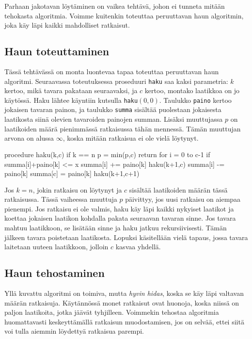 Parhaan jakotavan löytäminen on vaikea tehtävä,
johon ei tunneta mitään tehokasta algoritmia.
Voimme kuitenkin toteuttaa peruuttavan haun algoritmin,
joka käy läpi kaikki mahdolliset ratkaisut.

\subsection{Haun toteuttaminen}

Tässä tehtävässä on monta luontevaa tapaa toteuttaa
peruuttavan haun algoritmi.
Seuraavassa toteutuksessa proseduuri \texttt{haku} saa kaksi parametria:
$k$ kertoo, mikä tavara pakataan seuraavaksi,
ja $c$ kertoo, montako laatikkoa on jo käytössä.
Haku lähtee käyntiin kutsulla \texttt{haku}$(0,0)$.
Taulukko \texttt{paino} kertoo jokaisen tavaran painon,
ja taulukko \texttt{summa} sisältää puolestaan
jokaisesta laatikosta siinä olevien tavaroiden painojen summan.
Lisäksi muuttujassa $p$ on laatikoiden määrä pienimmässä ratkaisussa
tähän mennessä.
Tämän muuttujan arvona on alussa $\infty$,
koska mitään ratkaisua ei ole vielä löytynyt.

\begin{code}
procedure haku(k,c)
    if k == n
        p = min(p,c)
        return
    for i = 0 to c-1
        if summa[i]+paino[k] <= x
            summa[i] += paino[k]
            haku(k+1,c)
            summa[i] -= paino[k]
    summa[c] = paino[k]
    haku(k+1,c+1)
\end{code}

Jos $k=n$, jokin ratkaisu on löytynyt ja $c$ sisältää
laatikoiden määrän tässä ratkaisussa.
Tässä vaiheessa muuttuja $p$ päivittyy,
jos uusi ratkaisu on aiempaa pienempi.
Jos ratkaisu ei ole valmis, haku käy läpi kaikki
nykyiset laatikot ja koettaa jokaisen laatikon
kohdalla pakata seuraavan tavaran sinne.
Jos tavara mahtuu laatikkoon,
se lisätään sinne ja haku jatkuu rekursiivisesti.
Tämän jälkeen tavara poistetaan laatikosta.
Lopuksi käsitellään vielä tapaus, jossa tavara laitetaan
uuteen laatikkoon, jolloin $c$ kasvaa yhdellä.

\subsection{Haun tehostaminen}

Yllä kuvattu algoritmi on toimiva, mutta \emph{hyvin hidas},
koska se käy läpi valtavan määrän ratkaisuja.
Käytännössä monet ratkaisut ovat huonoja, koska niissä on
paljon laatikoita, jotka jäävät tyhjilleen.
Voimmekin tehostaa algoritmia huomattavasti keskeyttämällä
ratkaisun muodostamisen, jos on selvää, ettei siitä voi
tulla aiemmin löydettyä ratkaisua parempi.

